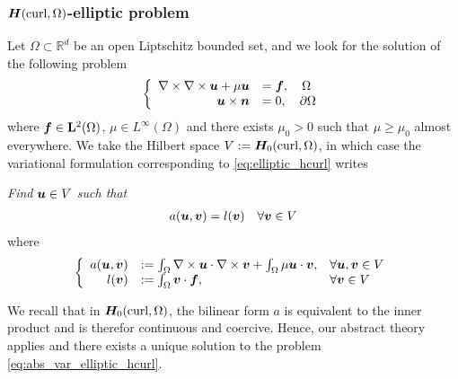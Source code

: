 \subsubsection*{$\bm{H}(\mbox{curl}, \Omega)$-elliptic problem}
Let $\Omega \subset \mathbb{R}^d$ be an open Liptschitz bounded set, and we look for the solution of the following problem
\begin{align}
  \left\{ 
  \begin{array}{rl}
    \nabla \times \nabla \times \bm{u} + \mu \bm{u} &= \bm{f}, \quad \Omega 
    \\
    \bm{u} \times \bm{n} &= 0, \quad \partial\Omega
  \end{array} \right.
  \label{eq:elliptic_hcurl}
\end{align}
where $\bm{f} \in \mathbf{L}^2(\Omega)$,  $\mu \in L^\infty(\Omega)$ and there exists $\mu_0 > 0$ such that $\mu \geq \mu_0$ almost everywhere.
We take the Hilbert space $V := \bm{H}_0(\mbox{curl}, \Omega)$, in which case the variational formulation corresponding to \eqref{eq:elliptic_hcurl} writes 
\begin{tcolorbox}
  {\em Find $\bm{u} \in V$ such that}
  \begin{align}
      a(\bm{u},\bm{v}) = l(\bm{v}) \quad \forall \bm{v} \in V 
    \label{eq:abs_var_elliptic_hcurl}
  \end{align}
  where 
  \begin{align}
    \left\{ 
    \begin{array}{rll}
    a(\bm{u}, \bm{v}) &:= \int_{\Omega} \nabla \times \bm{u} \cdot \nabla \times \bm{v} + \int_{\Omega} \mu \bm{u} \cdot \bm{v}, & \forall \bm{u}, \bm{v} \in V  \\
    l(\bm{v}) &:= \int_{\Omega} \bm{v} \cdot \bm{f}, & \forall \bm{v} \in V  
    \end{array} \right.
  \end{align}
  \label{tcb:elliptic_hcurl}
\end{tcolorbox}

We recall that in $\bm{H}_0(\mbox{curl}, \Omega)$, the bilinear form $a$ is equivalent to the inner product and is therefor continuous and coercive. Hence, our abstract theory applies and there exists a unique solution to the problem \eqref{eq:abs_var_elliptic_hcurl}.

